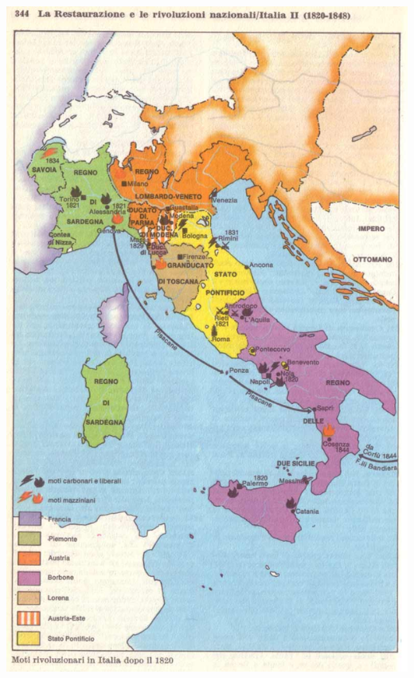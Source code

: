 \documentclass[a4paper,12pt, oneside]{book}
\begin{document}
   \begin{center}
   	\begin{minipage}{0.35\linewidth}
   		\includegraphics[width=\linewidth]{"Immagini/italia_1820-1848"}
   		\label{fig:italia_1820-1848}
   	\end{minipage}%
   	\hfill
   	\begin{minipage}{0.46\linewidth}

\end{minipage}
\end{center}
\end{document}
